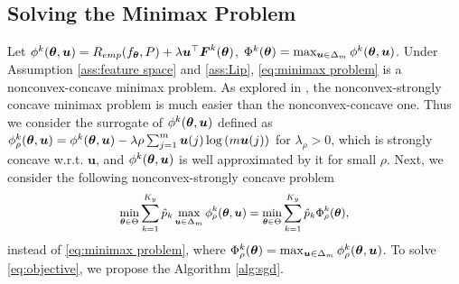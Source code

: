 \documentclass{article} %
\newcommand{\btheta}{\text{\boldmath{$\theta$}}}
\newcommand{\bF}{\boldsymbol{F}}
\newcommand{\bu}{\boldsymbol{u}}
\begin{document}
	\subsection{Solving the Minimax Problem}
	Let $\phi^{k}(\btheta, \bu) = R_{emp}(f_{\btheta}, P) + \lambda\bu^{\top}\bF^{k}(\btheta)$,  $\Phi^{k}(\btheta) = \max_{\bu\in\Delta_{m}}\phi^{k}(\btheta, \bu)$. Under Assumption \ref{ass:feature space} and \ref{ass:Lip}, \eqref{eq:minimax problem} is a nonconvex-concave minimax problem. As explored in \citep{lin2020gradient}, the nonconvex-strongly concave minimax problem is much easier than the nonconvex-concave one. Thus we consider the surrogate of $\phi^{k}(\btheta, \bu)$ defined as $\phi_{\rho}^{k}(\btheta, \bu) = \phi^{k}(\btheta, \bu) - \lambda\rho\sum_{j=1}^{m}\bu(j)\log{\left(m\bu(j)\right)}$ for $\lambda_{\rho} > 0$, 
	which is strongly concave w.r.t. $\bu$, and $\phi^{k}(\btheta, \bu)$ is well approximated by it for small $\rho$. Next, we consider the following nonconvex-strongly concave problem 
	\begin{equation}\label{eq:objective}
		\small
		\min_{\btheta\in\Theta}\sum_{k=1}^{K_{y}}\hat{p}_{k}\max_{\bu\in\Delta_{m}}\phi_{\rho}^{k}(\btheta, \bu) = \min_{\btheta\in\Theta}\sum_{k=1}^{K_{y}}\hat{p}_{k}\Phi_{\rho}^{k}(\btheta),
	\end{equation} 
	instead of \eqref{eq:minimax problem}, where $\Phi^{k}_{\rho}(\btheta) = \max_{\bu\in\Delta_{m}}\phi^{k}_{\rho}(\btheta, \bu)$. To solve \eqref{eq:objective}, we propose the Algorithm \ref{alg:sgd}.%
	
\end{document}
